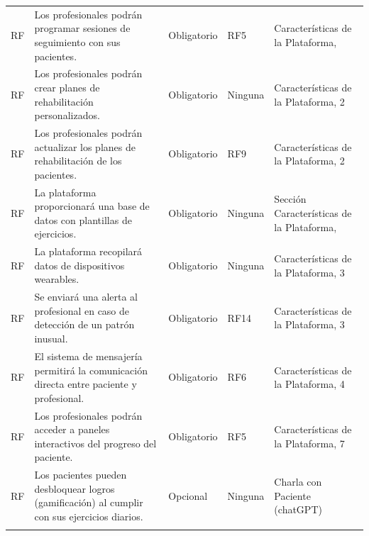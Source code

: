 \documentclass{article}
\begin{document}
\begin{longtable}{@{} p{1.5cm} p{5cm} p{3cm} p{2cm} p{3cm} @{}}
	\addlinespace \stepcounter{requisitosFuncionales}
	RF\therequisitosFuncionales & Los profesionales podrán programar sesiones de seguimiento con sus pacientes. & Obligatorio & RF5 & Características de la Plataforma,  \\ 
	\addlinespace \stepcounter{requisitosFuncionales}
	RF\therequisitosFuncionales & Los profesionales podrán crear planes de rehabilitación personalizados. & Obligatorio & Ninguna & Características de la Plataforma, 2  \\ 
	\addlinespace \stepcounter{requisitosFuncionales}
	RF\therequisitosFuncionales & Los profesionales podrán actualizar los planes de rehabilitación de los pacientes. & Obligatorio & RF9 & Características de la Plataforma, 2 \\ 
	\addlinespace \stepcounter{requisitosFuncionales}
	RF\therequisitosFuncionales & La plataforma proporcionará una base de datos con plantillas de ejercicios. & Obligatorio & Ninguna & Sección Características de la Plataforma,  \\ 

	\addlinespace \stepcounter{requisitosFuncionales}
	RF\therequisitosFuncionales & La plataforma recopilará datos de dispositivos wearables. & Obligatorio & Ninguna & Características de la Plataforma, 3 \\
	\addlinespace \stepcounter{requisitosFuncionales}
	RF\therequisitosFuncionales & Se enviará una alerta al profesional en caso de detección de un patrón inusual. & Obligatorio & RF14 & Características de la Plataforma, 3 \\
	\addlinespace \stepcounter{requisitosFuncionales}
	RF\therequisitosFuncionales & El sistema de mensajería permitirá la comunicación directa entre paciente y profesional. & Obligatorio & RF6 & Características de la Plataforma, 4 \\
	\addlinespace \stepcounter{requisitosFuncionales}
	
	RF\therequisitosFuncionales & Los profesionales podrán acceder a paneles interactivos del progreso del paciente. & Obligatorio & RF5 & Características de la Plataforma, 7  \\
	\addlinespace
	\stepcounter{requisitosFuncionales}RF\therequisitosFuncionales & Los pacientes pueden desbloquear logros (gamificación) al cumplir con sus ejercicios diarios. & Opcional & Ninguna & Charla con Paciente (chatGPT) \\
	\addlinespace
	\bottomrule
\end{longtable}
\end{document}
